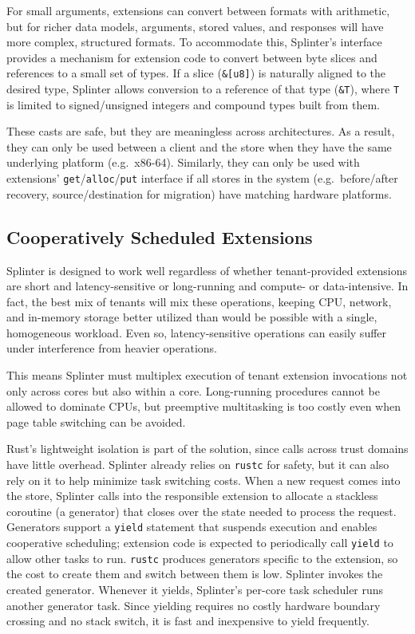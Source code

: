 For small arguments, extensions can convert between
  formats with arithmetic, but for richer data models, arguments, stored values, and responses will
  have more complex, structured formats.
To accommodate this, Splinter's interface provides a mechanism for extension
  code to convert between byte slices and references to a small set of types.
If a slice (\texttt{\&[u8]}) is naturally aligned to the desired
  type, Splinter allows conversion to a reference of that type
  (\texttt{\&T}), where \texttt{T} is limited to signed/unsigned
  integers and compound types built from them.

These casts are safe, but they are meaningless across architectures. As a
  result, they can only be used between a client and the store when they have
  the same underlying platform (e.g.\ x86-64).
Similarly, they can only be used with extensions'
  \texttt{get}/\texttt{alloc}/\texttt{put} interface if all stores in
  the system (e.g.\  before/after recovery, source/destination for migration) have matching hardware
  platforms.

\subsection{Cooperatively Scheduled Extensions}
\label{sec:coop}

Splinter is designed to work well regardless of whether tenant-provided
  extensions are short and latency-sensitive or long-running and compute- or
  data-intensive.
In fact, the best mix of tenants will mix these operations, keeping CPU,
  network, and in-memory storage better utilized than would be possible with a
  single, homogeneous workload.
Even so, latency-sensitive operations can easily suffer under interference from
  heavier operations.

This means Splinter must multiplex execution of tenant extension invocations
  not only across cores but also within a core.
Long-running procedures cannot be allowed to dominate CPUs, but
  preemptive multitasking is too costly even when page table switching can
  be avoided.

Rust's lightweight isolation is part of the solution, since calls across
  trust domains have little overhead.
Splinter already relies on \texttt{rustc} for safety, but it can also rely on
  it to help minimize task switching costs.
When a new request comes into the store, Splinter calls into the responsible extension
  to allocate a stackless coroutine (a generator) that closes
  over the state needed to process the request.
Generators support a
  \texttt{yield} statement that suspends execution and enables
  cooperative scheduling;
  extension code is expected to periodically call \texttt{yield} to
  allow other tasks to run.
\texttt{rustc} produces generators specific to the extension, so the
  cost to create them and switch between them is low.
Splinter invokes the created generator.
Whenever it yields,
  Splinter's per-core task scheduler runs another generator task.
Since yielding requires no costly hardware boundary crossing and no stack
  switch, it is fast and inexpensive to yield frequently.

